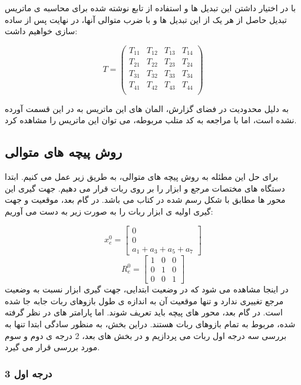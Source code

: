با در اختیار داشتن این تبدیل ها و استفاده از تابع نوشته شده برای محاسبه ی ماتریس تبدیل حاصل از هر یک از این تبدیل ها و با ضرب متوالی آنها، در نهایت پس از ساده سازی خواهیم داشت:

\[
T = \begin{pmatrix}
	T_{11} & T_{12} & T_{13} & T_{14} \\
	T_{21} & T_{22} & T_{23} & T_{24} \\
	T_{31} & T_{32} & T_{33} & T_{34} \\
	T_{41} & T_{42} & T_{43} & T_{44} \\
\end{pmatrix}
\]

به دلیل محدودیت در فضای گزارش، المان های این ماتریس به در این قسمت آورده نشده است، اما با مراجعه به کد متلب مربوطه، می توان این ماتریس را مشاهده کرد.

\subsection{روش پیچه های متوالی}
برای حل این مطئله به روش پیچه های متوالی، به طریق زیر عمل می کنیم.
ابتدا دستگاه های مختصات مرجع و ابزار را بر روی ربات قرار می دهیم. جهت گیری این محور ها مطابق با شکل رسم شده در کتاب می باشد.
در گام بعد، موقعیت و جهت گیری اولیه ی ابزار ربات را به صورت زیر به دست می آوریم:

\[
x_e^0 = \begin{bmatrix}
	0 \\
	0 \\
	a_1 + a_3 + a_5 + a_7
\end{bmatrix}
\]
\[
R_e^0 = \begin{bmatrix}
	1 & 0 & 0 \\
	0 & 1 & 0 \\
	0 & 0 & 1
\end{bmatrix}
\]
در اینجا مشاهده می شود که در وضعیت ابتدایی، جهت گیری ابزار نسبت به وضعیت مرجع تغییری ندارد و تنها موقعیت آن به اندازه ی طول بازوهای ربات جابه جا شده است.
در گام بعد، محور های پیچه باید تعریف شوند.
اما پارامتر های در نظر گرفته شده، مربوط به تمام بازوهای ربات هستند. دراین بخش، به منظور سادگی ابتدا تنها به بررسی سه درجه اول ربات می پردازیم و در بخش های بعد، 2 درجه ی دوم و سوم مورد بررسی قرار می گیرد.
\subsubsection{3 درجه اول}

